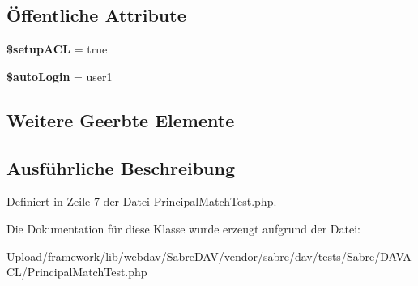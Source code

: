 \subsection*{Öffentliche Attribute}
\begin{DoxyCompactItemize}
\item 
\mbox{\label{class_sabre_1_1_d_a_v_a_c_l_1_1_principal_match_test_a10372ed82a4f8422cdfa66e6e9edc91d}} 
{\bfseries \$setup\+A\+CL} = true
\item 
\mbox{\label{class_sabre_1_1_d_a_v_a_c_l_1_1_principal_match_test_a8aab73331644190abe9a4009fde14f9f}} 
{\bfseries \$auto\+Login} = \textquotesingle{}user1\textquotesingle{}
\end{DoxyCompactItemize}
\subsection*{Weitere Geerbte Elemente}


\subsection{Ausführliche Beschreibung}


Definiert in Zeile 7 der Datei Principal\+Match\+Test.\+php.



Die Dokumentation für diese Klasse wurde erzeugt aufgrund der Datei\+:\begin{DoxyCompactItemize}
\item 
Upload/framework/lib/webdav/\+Sabre\+D\+A\+V/vendor/sabre/dav/tests/\+Sabre/\+D\+A\+V\+A\+C\+L/Principal\+Match\+Test.\+php\end{DoxyCompactItemize}
